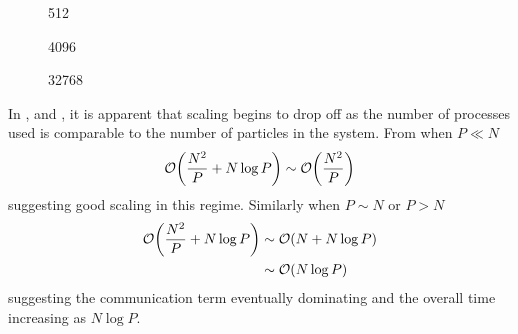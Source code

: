 %
%
\begin{figure}[!h]
    
    \caption{
        \vZeroTimeCaption
            {\replicateddata{}}
            {\pairoperation{}}
            {512}
    }
    \label{fig:v0_replicated_pair_operation_512_logtime}
\end  {figure}

\begin{figure}[!h]
    
    \caption{
        \vZeroTimeCaption
            {\replicateddata{}}
            {\pairoperation{}}
            {4096}
    }
    \label{fig:v0_replicated_pair_operation_4096_logtime}
\end  {figure}

\begin{figure}[!h]
    
    \caption{
        \vZeroTimeCaption
            {\replicateddata{}}
            {\pairoperation{}}
            {32768}
    }
    \label{fig:v0_replicated_pair_operation_32768_logtime}
\end  {figure}

\vZeroTimeExplanation
    {}
    {}
    {}
    {\pairoperation{}}
    {\replicateddata{}}

%
In ,
 and
,
it is apparent that scaling begins to drop off as the number
of processes used is comparable to the number of particles in the system.
%
From  when $P \ll{} N$
\begin{equation}
    \mathcal{O}{\left({ \frac{N^2}{P} + N\log{P} }\right)} \sim{} \mathcal{O}{\left({ \frac{N^2}{P} }\right)}
\end  {equation}
suggesting good scaling in this regime.
%
Similarly when $P \sim{} N$
or $P > N$
\begin{equation}
    \begin{split}
        \mathcal{O}{\left({ \frac{N^2}{P} + N\log{P} }\right)}
            &\sim{} \mathcal{O}{\left({ N + N\log{P} }\right)} \\
            &\sim{} \mathcal{O}{\left({ N\log{P} }\right)}
    \end{split}
\end{equation}
%
suggesting the communication term eventually dominating and
the overall time increasing as $N\log{P}$.

